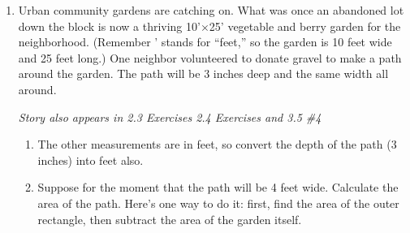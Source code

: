 \begin{enumerate} 

\item Urban community gardens are catching on.  What was once an abandoned lot down the block is now a thriving 10'$\times$25' vegetable and berry garden for the neighborhood. (Remember ' stands for ``feet,'' so the garden is 10 feet wide and 25 feet long.)  One neighbor volunteered to donate gravel to make a path around the garden.  The path will be 3 inches deep and the same width all around. 

 \begin{center}
 \end{center}
 \hfill \emph{Story also appears in 2.3 Exercises 2.4 Exercises and 3.5 \#4}
\begin{enumerate}
\item The other measurements are in feet, so convert the depth of the path (3 inches) into feet also.  
\item Suppose for the moment that the path will be 4 feet wide. Calculate the area of the path.  Here's one way to do it:  first, find the area of the outer rectangle, then subtract the area of the garden itself.


\end{enumerate}
\end{enumerate}
